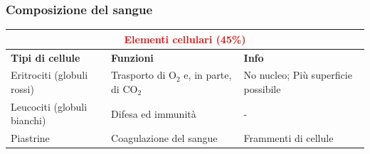 \documentclass{article}
\begin{document}
\subsubsection{Composizione del sangue}
\vspace*{0.5cm}
\begin{table}[ht!]
    \centering
    \setlength{\extrarowheight}{4pt}
    \renewcommand{\arraystretch}{1.5}
    \begin{tabular}{|p{4cm}|p{5cm}|p{4cm}|}
    \hline
    \multicolumn{3}{|c|}{\textbf{\textcolor{red}{Elementi cellulari (45\%)}}} \\ \hline
    \textbf{Tipi di cellule} & \textbf{Funzioni} & \textbf{Info} \\ \hline
    Eritrociti (globuli rossi) & Trasporto di O$_2$ e, in parte, di CO$_2$ & No nucleo; \newline Più superficie possibile \\ \hline
    Leucociti (globuli bianchi) & Difesa ed immunità & - \\ \hline
    Piastrine & Coagulazione del sangue & Frammenti di cellule \\ \hline
    \end{tabular}
\end{table}
\vspace*{1cm}
\end{document}

